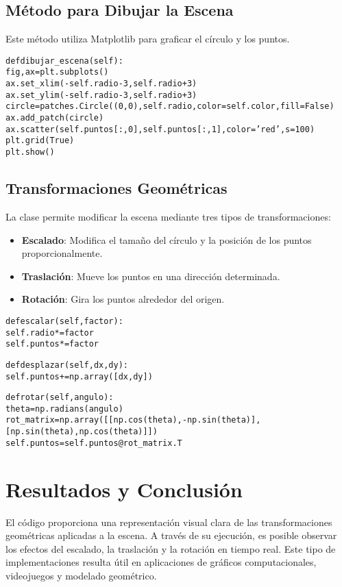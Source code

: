 \documentclass[a4paper, 10pt]{article}
\begin{document}
\subsection{Método para Dibujar la Escena}
Este método utiliza Matplotlib para graficar el círculo y los puntos.

\begin{alltt}
    def dibujar_escena(self):
        fig, ax = plt.subplots()
        ax.set_xlim(-self.radio - 3, self.radio + 3)
        ax.set_ylim(-self.radio - 3, self.radio + 3)
        circle = patches.Circle((0, 0), self.radio, color=self.color, fill=False)
        ax.add_patch(circle)
        ax.scatter(self.puntos[:, 0], self.puntos[:, 1], color='red', s=100)
        plt.grid(True)
        plt.show()
\end{alltt}

\subsection{Transformaciones Geométricas}
La clase permite modificar la escena mediante tres tipos de transformaciones:

\begin{itemize}
    \item \textbf{Escalado}: Modifica el tamaño del círculo y la posición de los puntos proporcionalmente.
    \item \textbf{Traslación}: Mueve los puntos en una dirección determinada.
    \item \textbf{Rotación}: Gira los puntos alrededor del origen.
\end{itemize}

\begin{alltt}
    def escalar(self, factor):
        self.radio *= factor
        self.puntos *= factor

    def desplazar(self, dx, dy):
        self.puntos += np.array([dx, dy])

    def rotar(self, angulo):
        theta = np.radians(angulo)
        rot_matrix = np.array([[np.cos(theta), -np.sin(theta)],
                               [np.sin(theta), np.cos(theta)]])
        self.puntos = self.puntos @ rot_matrix.T
\end{alltt}

\section{Resultados y Conclusión}
El código proporciona una representación visual clara de las transformaciones geométricas aplicadas a la escena. A través de su ejecución, es posible observar los efectos del escalado, la traslación y la rotación en tiempo real. Este tipo de implementaciones resulta útil en aplicaciones de gráficos computacionales, videojuegos y modelado geométrico.
\end{document}
